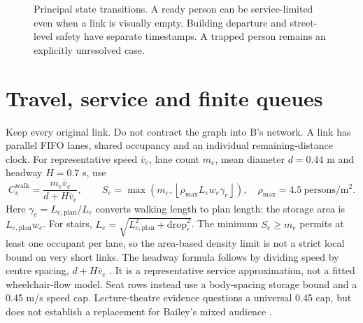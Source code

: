 \documentclass[11pt,a4paper]{article}
\begin{document}
\begin{figure}[htbp]\centering
{}
\caption{Principal state transitions. A ready person can be service-limited even when a link is visually empty. Building departure and street-level safety have separate timestamps. A trapped person remains an explicitly unresolved case.}
\label{fig:states}
\end{figure}

\section{Travel, service and finite queues}

Keep every original link. Do not contract the graph into B's network. A link has parallel FIFO lanes, shared occupancy and an individual remaining-distance clock. For representative speed $\bar v_e$, lane count $m_e$, mean diameter $d=0.44$ m and headway $H=0.7$ s, use
\begin{equation}\label{impl:eq7}
 C_e^{\mathrm{walk}}=\frac{m_e\bar v_e}{d+H\bar v_e},\qquad
 S_e=\max\!\left(m_e,\left\lfloor\rho_{\max}L_ew_e\gamma_e\right\rfloor\right),
 \quad\rho_{\max}=4.5\ \mathrm{persons/m^2}.
\end{equation}
Here $\gamma_e=L_{e,\mathrm{plan}}/L_e$ converts walking length to plan length: the storage area is $L_{e,\mathrm{plan}}w_e$. For stairs, $L_e=\sqrt{L_{e,\mathrm{plan}}^2+\mathrm{drop}_e^2}$. The minimum $S_e\ge m_e$ permits at least one occupant per lane, so the area-based density limit is not a strict local bound on very short links. The headway formula follows by dividing speed by centre spacing, $d+H\bar v_e$ \cite{seyfried,johansson}. It is a representative service approximation, not a fitted wheelchair-flow model. Seat rows instead use a body-spacing storage bound and a 0.45 m/s speed cap. Lecture-theatre evidence questions a universal 0.45 cap, but does not establish a replacement for Bailey's mixed audience \cite{spearpoint}.
\end{document}
